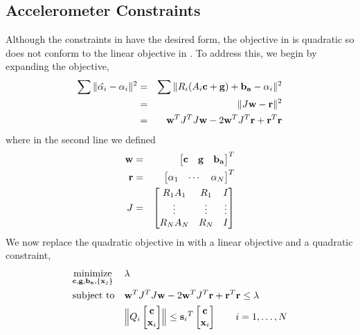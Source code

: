 \subsection{Accelerometer Constraints}
Although the constraints in  have the desired
form, the objective in  is quadratic so does
not conform to the linear objective in . To
address this, we begin by expanding the objective,
\begin{eqnarray}
  \sum \| \hat{\mathbf{\alpha}_i} - \mathbf{\alpha}_i \|^2 &=&
  \sum \| R_i (A_i \mathbf{c} + \mathbf{g}) + \mathbf{b_a} -
  \mathbf{\alpha}_i \|^2\\
  &=& \| J \mathbf{w} - \mathbf{r} \|^2 \\
  &=& \mathbf{w}^T J^T J \mathbf{w} - 2 \mathbf{w}^T J^T \mathbf{r} + \mathbf{r}^T\mathbf{r}
\end{eqnarray}
where in the second line we defined
\begin{eqnarray}
  \mathbf{w} &=& \begin{bmatrix}\mathbf{c}&\mathbf{g}&\mathbf{b_a}\end{bmatrix}^T \\
  \mathbf{r} &=& \begin{bmatrix} \mathbf{\alpha}_1 & \cdots &
    \mathbf{\alpha}_N \end{bmatrix}^T \\
  J &=& \begin{bmatrix}
    R_1A_1 & R_1 & I \\
    \vdots & \vdots & \vdots \\
    R_NA_N & R_N & I
  \end{bmatrix}
\end{eqnarray}
We now replace the quadratic objective in 
with a linear objective and a quadratic constraint,
\begin{equation}
  \begin{aligned}
    & \underset{\AllVars}{\text{minimize}} & & \lambda \\
    & \text{subject to}
    & & \vec{w}^T J^T J \vec{w} - 2 \vec{w}^T J^T \vec{r} +
    \vec{r}^T\vec{r} \leq \lambda \\
    & & &
    \Bigl\| Q_i \begin{bmatrix}\Controls\\\Landmark_i\end{bmatrix} \Bigr\| \leq
    {\vec{s}_i}^T \begin{bmatrix}\Controls\\\Landmark_i\end{bmatrix}
    ~~~~~~
    i = 1,\ldots,N
  \end{aligned}
  \label{second-transform}
\end{equation}

